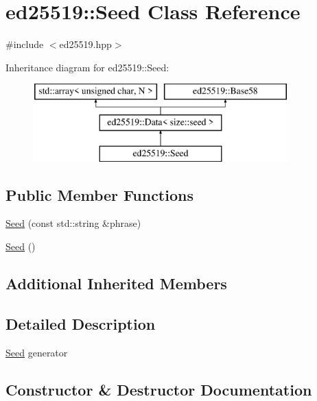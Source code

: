 \hypertarget{classed25519_1_1_seed}{}\section{ed25519\+::Seed Class Reference}
\label{classed25519_1_1_seed}


{\ttfamily \#include $<$ed25519.\+hpp$>$}

Inheritance diagram for ed25519\+::Seed\+:\begin{figure}[H]
\begin{center}
\leavevmode
\includegraphics[height=3.000000cm]{classed25519_1_1_seed}
\end{center}
\end{figure}
\subsection*{Public Member Functions}
\begin{DoxyCompactItemize}
\item 
\mbox{\hyperlink{classed25519_1_1_seed_ad1e098bfd87b7bcbb74fe5aefd03200a}{Seed}} (const std\+::string \&phrase)
\item 
\mbox{\hyperlink{classed25519_1_1_seed_ade6584a80efeb3ad8b89929a9684b30f}{Seed}} ()
\end{DoxyCompactItemize}
\subsection*{Additional Inherited Members}


\subsection{Detailed Description}
\mbox{\hyperlink{classed25519_1_1_seed}{Seed}} generator 

\subsection{Constructor \& Destructor Documentation}
\mbox{\label{classed25519_1_1_seed_ad1e098bfd87b7bcbb74fe5aefd03200a}} 

